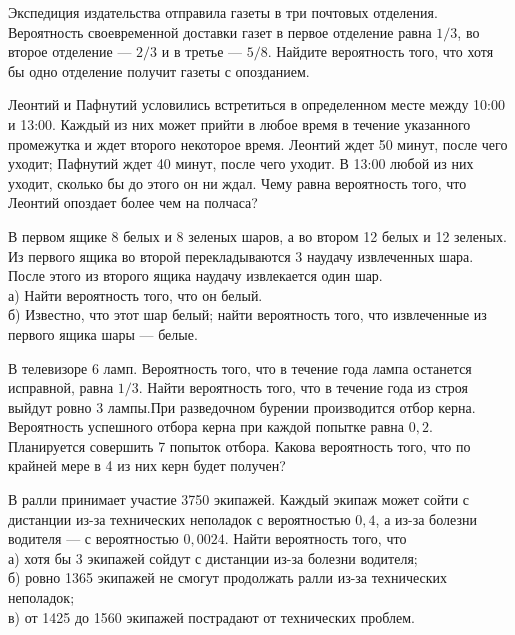 \newpage\setcounter{zad}{0}



\begin{zkrW}{20}\noindent 
	Экспедиция издательства отправила газеты в три почтовых отделения. Вероятность своевременной доставки газет в первое отделение равна $1/3$, во второе отделение --- $2/3$ и в третье --- $5/8$. Найдите вероятность того, что хотя бы одно отделение получит газеты с опозданием.
 
\end{zkrW}

\begin{zkrW}{20}\noindent 
	Леонтий и Пафнутий условились встретиться в определенном месте между 10:00 и 13:00. Каждый из них может прийти в любое время в течение указанного промежутка и ждет второго некоторое время. Леонтий ждет 50 минут, после чего уходит; Пафнутий ждет 40 минут, после чего уходит. В 13:00 любой из них уходит, сколько бы до этого он ни ждал. Чему равна вероятность того, что Леонтий опоздает более чем на полчаса?
 
\end{zkrW}

\begin{zkrW}{20}\noindent 
	В первом ящике 8 белых и 8 зеленых шаров, а во втором 12 белых и 12 зеленых. Из первого ящика во второй перекладываются 3 наудачу извлеченных шара. После этого из второго ящика наудачу извлекается один шар. \\ \indent а) Найти вероятность того, что он белый. \\ \indent б) Известно, что этот шар белый; найти вероятность того, что извлеченные из первого ящика шары --- белые.
 
\end{zkrW}

\begin{zkrW}{20}\noindent 
	В телевизоре 6 ламп. Вероятность того, что в течение года лампа останется исправной, равна $1/3$. Найти вероятность того, что в течение года из строя выйдут ровно 3 лампы.При разведочном бурении производится отбор керна. Вероятность успешного отбора керна при каждой попытке равна $0{,}2$. Планируется совершить 7 попыток отбора. Какова вероятность того, что по крайней мере в 4 из них керн будет получен?
 
\end{zkrW}

\begin{zkrW}{20}\noindent 
	В ралли принимает участие 3750 экипажей. Каждый экипаж может сойти с дистанции из-за технических неполадок с вероятностью $0{,}4$, а из-за болезни водителя --- с вероятностью $0{,}0024$. Найти вероятность того, что \\ \indent а) хотя бы 3 экипажей сойдут с дистанции из-за болезни водителя; \\ \indent б) ровно 1365 экипажей не смогут продолжать ралли из-за технических неполадок; \\ \indent в) от 1425 до 1560 экипажей пострадают от технических проблем.
 
\end{zkrW}

